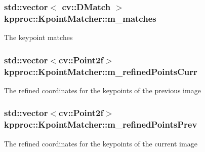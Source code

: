\subsubsection[{\texorpdfstring{m\+\_\+matches}{m_matches}}]{\setlength{\rightskip}{0pt plus 5cm}std\+::vector$<$ cv\+::\+D\+Match $>$ kpproc\+::\+Kpoint\+Matcher\+::m\+\_\+matches\hspace{0.3cm}{\ttfamily [private]}}\hypertarget{classkpproc_1_1KpointMatcher_a082b2988b8e0381f2286dcaa1725a8db}{}\label{classkpproc_1_1KpointMatcher_a082b2988b8e0381f2286dcaa1725a8db}
The keypoint matches 
\subsubsection[{\texorpdfstring{m\+\_\+refined\+Points\+Curr}{m_refinedPointsCurr}}]{\setlength{\rightskip}{0pt plus 5cm}std\+::vector$<$cv\+::\+Point2f$>$ kpproc\+::\+Kpoint\+Matcher\+::m\+\_\+refined\+Points\+Curr\hspace{0.3cm}{\ttfamily [private]}}\hypertarget{classkpproc_1_1KpointMatcher_a9a0c678dccf356d72b2a69542bcfe960}{}\label{classkpproc_1_1KpointMatcher_a9a0c678dccf356d72b2a69542bcfe960}
The refined coordinates for the keypoints of the previous image 
\subsubsection[{\texorpdfstring{m\+\_\+refined\+Points\+Prev}{m_refinedPointsPrev}}]{\setlength{\rightskip}{0pt plus 5cm}std\+::vector$<$cv\+::\+Point2f$>$ kpproc\+::\+Kpoint\+Matcher\+::m\+\_\+refined\+Points\+Prev\hspace{0.3cm}{\ttfamily [private]}}\hypertarget{classkpproc_1_1KpointMatcher_ad21af067c2a5fa339aba9abe85fa943a}{}\label{classkpproc_1_1KpointMatcher_ad21af067c2a5fa339aba9abe85fa943a}
The refined coordinates for the keypoints of the current image 
